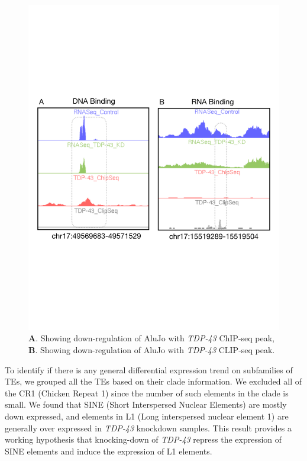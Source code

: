 \documentclass[wsdraft]{ws-procs11x85}
\begin{document}
\begin{figure}[!ht]
\centerline{
\includegraphics[width=16cm]{fig_hari}
}
\caption{
\textbf{A}. Showing down-regulation of AluJo with \textit{TDP-43} ChIP-seq peak,
\textbf{B}. Showing down-regulation of AluJo with \textit{TDP-43} CLIP-seq peak.
}
\label{aba:fig_hari}
\end{figure}


To identify if there is any general differential expression trend on subfamilies of TEs, we grouped all the TEs based on their clade information. We excluded all of the CR1 (Chicken Repeat 1) since the number of such elements in the clade is small.
We found that SINE (Short Interspersed Nuclear Elements) are mostly down expressed,
and elements in L1 (Long interspersed nuclear element 1) are generally over expressed in \textit{TDP-43} knockdown samples. 
This result provides a working hypothesis that knocking-down of \textit{TDP-43}  repress the expression of SINE elements and induce the expression of L1 elements.
\end{document}
